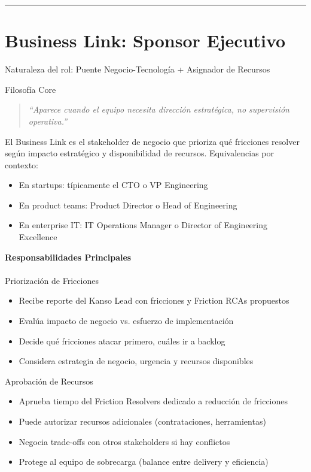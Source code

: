 \hrule
\section{Business Link: Sponsor Ejecutivo}

Naturaleza del rol: Puente Negocio-Tecnología + Asignador de Recursos

Filosofía Core

\begin{quote}
\textit{``Aparece cuando el equipo necesita dirección estratégica, no supervisión operativa.''}
\end{quote}

El Business Link es el stakeholder de negocio que prioriza qué fricciones resolver según impacto estratégico 
y disponibilidad de recursos. Equivalencias por contexto:

\begin{itemize}
    \item En startups: típicamente el CTO o VP Engineering
    \item En product teams: Product Director o Head of Engineering
    \item En enterprise IT: IT Operations Manager o Director of Engineering Excellence
\end{itemize}

\textbf{Responsabilidades Principales}
\\
\\
Priorización de Fricciones
\begin{itemize}
    \item Recibe reporte del Kanso Lead con fricciones y Friction RCAs propuestos
    \item Evalúa impacto de negocio vs. esfuerzo de implementación
    \item Decide qué fricciones atacar primero, cuáles ir a backlog
    \item Considera estrategia de negocio, urgencia y recursos disponibles
\end{itemize}

Aprobación de Recursos
\begin{itemize}
    \item Aprueba tiempo del Friction Resolvers dedicado a reducción de fricciones
    \item Puede autorizar recursos adicionales (contrataciones, herramientas)
    \item Negocia trade-offs con otros stakeholders si hay conflictos
    \item Protege al equipo de sobrecarga (balance entre delivery y eficiencia)
\end{itemize}

